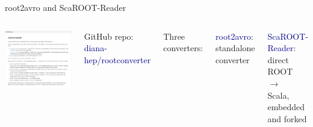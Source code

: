 \documentclass{beamer}
\begin{document}
\begin{frame}{root2avro and ScaROOT-Reader}
\vspace{0.5 cm}
\begin{columns}
\includegraphics[width=\linewidth]{rootconverter.png}

GitHub repo:
\textcolor{darkblue}{diana-hep/rootconverter}

\vspace{0.5 cm}
Three converters:

\vspace{0.2 cm}
\textcolor{darkblue}{root2avro}: \\
\hspace{0.25 cm} standalone \\
\hspace{0.25 cm} converter

\vspace{0.2 cm}
\textcolor{darkblue}{ScaROOT-Reader}: \\
\hspace{0.25 cm} direct ROOT $\to$ \\
\hspace{0.25 cm} Scala, embedded \\
\hspace{0.25 cm} and forked
\end{columns}
\end{frame}
\end{document}
